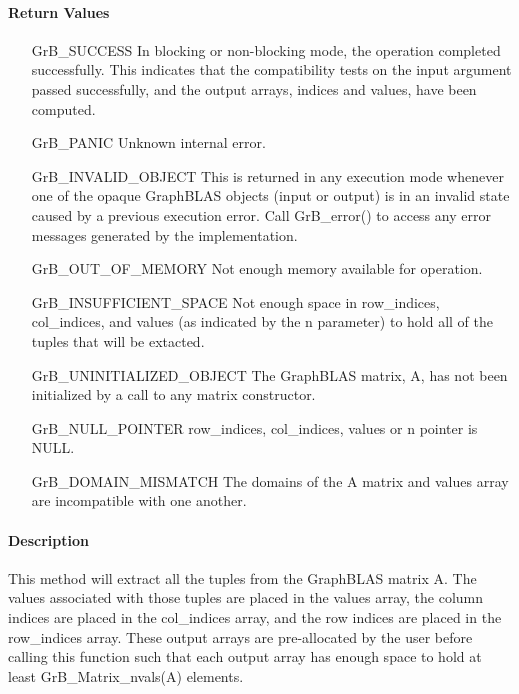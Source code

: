 \paragraph{Return Values}

\begin{itemize}[leftmargin=2.1in]
    \item[{\sf GrB\_SUCCESS}]  In blocking or non-blocking mode, the operation 
    completed successfully. This indicates that the compatibility tests on 
    the input argument passed successfully, and the output arrays, {\sf indices}
    and {\sf values}, have been computed.

    \item[{\sf GrB\_PANIC}]   Unknown internal error.
    
    \item[{\sf GrB\_INVALID\_OBJECT}] This is returned in any execution mode 
    whenever one of the opaque GraphBLAS objects (input or output) is in an invalid 
    state caused by a previous execution error.  Call {\sf GrB\_error()} to access 
    any error messages generated by the implementation.

    \item[{\sf GrB\_OUT\_OF\_MEMORY}]  Not enough memory available for operation.

    \item[{\sf GrB\_INSUFFICIENT\_SPACE}]  Not enough space in {\sf row\_indices}, 
    {\sf col\_indices}, and {\sf values} (as indicated by the {\sf n} parameter) 
    to hold all of the tuples that will be extacted.
    
    \item[{\sf GrB\_UNINITIALIZED\_OBJECT}]  The GraphBLAS matrix, {\sf A}, has 
    not been initialized by a call to any matrix constructor.
    
    \item[{\sf GrB\_NULL\_POINTER}]  {\sf row\_indices}, {\sf col\_indices}, 
    {\sf values} or {\sf n} pointer is {\sf NULL}.
    
    \item[\sf GrB\_DOMAIN\_MISMATCH] The domains of the {\sf A} matrix and 
    {\sf values} array are incompatible with one another.
\end{itemize}

\paragraph{Description}


This method will extract all the tuples from the GraphBLAS matrix {\sf A}.  
The values associated with those tuples are placed in the
{\sf values} array, the column indices are placed in the {\sf col\_indices} array, 
and the row indices are placed in the {\sf row\_indices} array. 
These output arrays are pre-allocated by the user before calling
this function such that each output array has enough
space to hold at least {\sf GrB\_Matrix\_nvals(A)} elements. 

